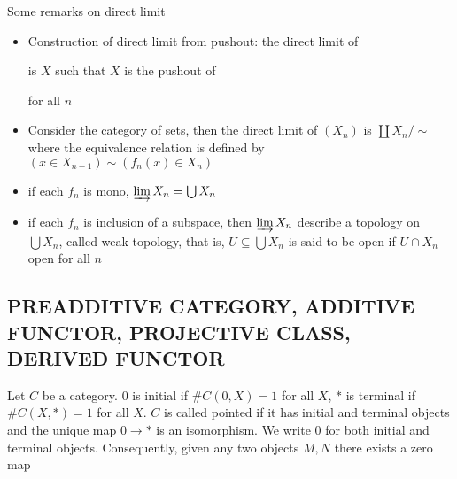 \documentclass{report}
\begin{document}
\begin{remark}
    Some remarks on direct limit
    \begin{itemize}
        \item Construction of direct limit from pushout: the direct limit of  is $X$ such that $X$ is the pushout of  for all $n$
        \item Consider the category of sets, then the direct limit of $(X_n)$ is $\coprod X_n / \sim$ where the equivalence relation is defined by $(x \in X_{n-1}) \sim (f_n(x) \in X_n)$
        \begin{center}
        \end{center}
    
        \item if each $f_n$ is mono, $\varinjlim X_n = \bigcup X_n$
        \item if each $f_n$ is inclusion of a subspace, then $\varinjlim X_n$ describe a topology on $\bigcup X_n$, called weak topology, that is, $U \subseteq \bigcup X_n$ is said to be open if $U \cap X_n$ open for all $n$
    \end{itemize}
\end{remark}

\subsection{PREADDITIVE CATEGORY, ADDITIVE FUNCTOR, PROJECTIVE CLASS, DERIVED FUNCTOR}

\begin{definition}
    Let $C$ be a category. $0$ is initial if $\# C(0, X) = 1$ for all $X$, $*$ is terminal if $\# C(X, *) = 1$ for all $X$. $C$ is called pointed if it has initial and terminal objects and the unique map $0 \to *$ is an isomorphism. We write $0$ for both initial and terminal objects. Consequently, given any two objects $M, N$ there exists a zero map
    \begin{center}
    \end{center}
\end{definition}
\end{document}
